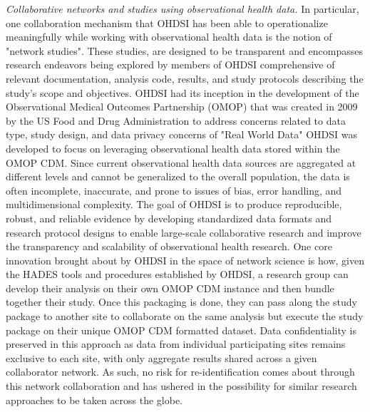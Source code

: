 \documentclass{juliacon}
\begin{document}
\textit{Collaborative networks and studies using observational health data.} In particular, one collaboration mechanism that OHDSI has been able to operationalize meaningfully while working with observational health data is the notion of "network studies".
These studies, are designed to be transparent and encompasses research endeavors being explored by members of OHDSI comprehensive of relevant documentation, analysis code, results, and study protocols describing the study's scope and objectives.
OHDSI had its inception in the development of the Observational Medical Outcomes Partnership (OMOP) that was created in 2009 by the US Food and Drug Administration to address concerns related to data type, study design, and data privacy concerns of "Real World Data" \cite{ohdsi2019book} \cite{FDARealWorldEvidence}
OHDSI was developed to focus on leveraging observational health data stored within the OMOP CDM.
Since current observational health data sources are aggregated at different levels and cannot be generalized to the overall population, the data is often incomplete, inaccurate, and prone to issues of bias, error handling, and multidimensional complexity. 
The goal of OHDSI is to produce reproducible, robust, and reliable evidence by developing standardized data formats and research protocol designs to enable large-scale collaborative research and improve the transparency and scalability of observational health research. 
One core innovation brought about by OHDSI in the space of network science is how, given the HADES tools and procedures established by OHDSI, 
a research group can develop their analysis on their own OMOP CDM instance and then bundle together their study.
Once this packaging is done, they can pass along the study package to another site to collaborate on the same analysis but execute the study package on their unique OMOP CDM formatted dataset.
Data confidentiality is preserved in this approach as data from individual participating sites remains exclusive to each site, with only aggregate results shared across a given collaborator network.
As such, no risk for re-identification comes about through this network collaboration and has ushered in the possibility for similar research approaches to be taken across the globe. \cite{ohdsi2019book}
\end{document}
